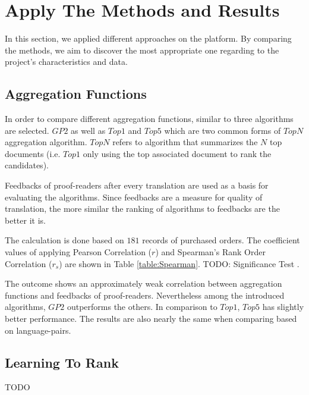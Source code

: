 \section{Apply The Methods and Results}
\label{sec:apply}
In this section, we applied different approaches on the platform. By comparing the methods, we aim to discover the most appropriate one regarding to the project's characteristics and data.

\subsection{Aggregation Functions}
In order to compare different aggregation functions, similar to \citet{agg-gp2} three algorithms are selected. $GP2$ as well as $Top1$ and $Top5$ which are two common forms of $TopN$ aggregation algorithm. $TopN$ refers to algorithm that summarizes the $N$ top documents (i.e. $Top1$ only using the top associated document to rank the candidates).

Feedbacks of proof-readers after every translation are used as a basis for evaluating the algorithms. Since feedbacks are a measure for quality of translation, the more similar the ranking of algorithms to feedbacks are the better it is. 

The calculation is done based on $181$ records of purchased orders. The coefficient values of applying Pearson Correlation ($r$) and Spearman's Rank Order Correlation ($r_s$) are shown in Table \ref{table:Spearman}. TODO: Significance Test . 

The outcome shows an approximately weak correlation between aggregation functions and feedbacks of proof-readers. Nevertheless among the introduced algorithms, $GP2$ outperforms the others. In comparison to $Top1$, $Top5$ has slightly better performance. The results are also nearly the same when comparing based on language-pairs.

\begin{table}
\begin{center}
\caption{Comparison between algorithms and feedbacks}
\label{table:Spearman}
\end{center}
\end{table}

\subsection{Learning To Rank}
TODO